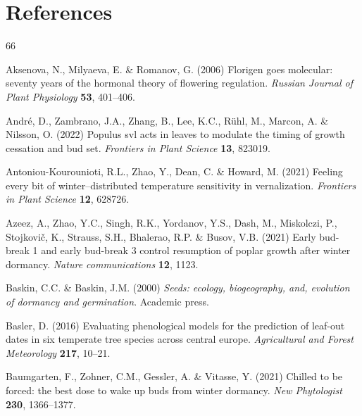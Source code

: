 \documentclass[11pt]{article}
\begin{document}
\section{References}
\begin{thebibliography}{66}
\providecommand{\natexlab}[1]{#1}

Aksenova, N., Milyaeva, E. \& Romanov, G. (2006) Florigen goes molecular:
  seventy years of the hormonal theory of flowering regulation. \emph{Russian
  Journal of Plant Physiology} \textbf{53}, 401--406.

Andr{\'e}, D., Zambrano, J.A., Zhang, B., Lee, K.C., R{\"u}hl, M., Marcon, A.
  \& Nilsson, O. (2022) Populus svl acts in leaves to modulate the timing of
  growth cessation and bud set. \emph{Frontiers in Plant Science} \textbf{13},
  823019.

Antoniou-Kourounioti, R.L., Zhao, Y., Dean, C. \& Howard, M. (2021) Feeling
  every bit of winter--distributed temperature sensitivity in vernalization.
  \emph{Frontiers in Plant Science} \textbf{12}, 628726.

Azeez, A., Zhao, Y.C., Singh, R.K., Yordanov, Y.S., Dash, M., Miskolczi, P.,
  Stojkovi{\v{c}}, K., Strauss, S.H., Bhalerao, R.P. \& Busov, V.B. (2021)
  Early bud-break 1 and early bud-break 3 control resumption of poplar growth
  after winter dormancy. \emph{Nature communications} \textbf{12}, 1123.

Baskin, C.C. \& Baskin, J.M. (2000) \emph{Seeds: ecology, biogeography, and,
  evolution of dormancy and germination}. Academic press.

Basler, D. (2016) Evaluating phenological models for the prediction of leaf-out
  dates in six temperate tree species across central europe. \emph{Agricultural
  and Forest Meteorology} \textbf{217}, 10--21.

Baumgarten, F., Zohner, C.M., Gessler, A. \& Vitasse, Y. (2021) Chilled to be
  forced: the best dose to wake up buds from winter dormancy. \emph{New
  Phytologist} \textbf{230}, 1366--1377.


\end{thebibliography}
\end{document}
